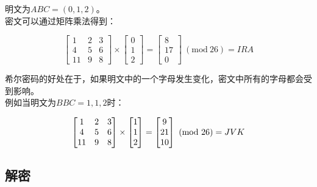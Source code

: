 \vspace{0.5cm}

明文为$ ABC = (0, 1, 2) $。\\

密文可以通过矩阵乘法得到：

$$
    \begin{bmatrix}
        1  & 2 & 3 \\
        4  & 5 & 6 \\
        11 & 9 & 8
    \end{bmatrix}
    \times
    \begin{bmatrix}
        0 \\
        1 \\
        2
    \end{bmatrix}
    =
    \begin{bmatrix}
        8  \\
        17 \\
        0
    \end{bmatrix}
    \ (\text{mod}\ 26) = IRA
$$

\vspace{0.5cm}

希尔密码的好处在于，如果明文中的一个字母发生变化，密文中所有的字母都会受到影响。\\

例如当明文为$ BBC = {1, 1, 2} $时：

$$
    \begin{bmatrix}
        1  & 2 & 3 \\
        4  & 5 & 6 \\
        11 & 9 & 8
    \end{bmatrix}
    \times
    \begin{bmatrix}
        1 \\
        1 \\
        2
    \end{bmatrix}
    =
    \begin{bmatrix}
        9  \\
        21 \\
        10
    \end{bmatrix}
    \ (\text{mod}\ 26) = JVK\\
$$

\vspace{0.5cm}

\subsection{解密}

